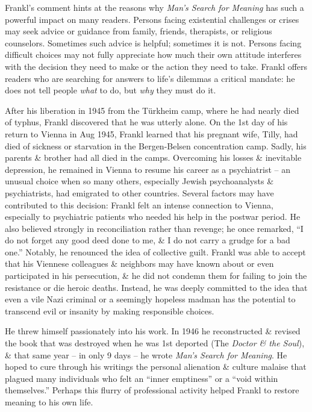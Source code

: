 \documentclass{article}
\numberwithin{equation}{section}
\begin{document}
Frankl's comment hints at the reasons why \textit{Man's Search for Meaning} has such a powerful impact on many readers. Persons facing existential challenges or crises may seek advice or guidance from family, friends, therapists, or religious counselors. Sometimes such advice is helpful; sometimes it is not. Persons facing difficult choices may not fully appreciate how much their own attitude interferes with the decision they need to make or the action they need to take. Frankl offers readers who are searching for answers to life's dilemmas a critical mandate: he does not tell people \textit{what} to do, but \textit{why} they must do it.

After his liberation in 1945 from the T\"urkheim camp, where he had nearly died of typhus, Frankl discovered that he was utterly alone. On the 1st day of his return to Vienna in Aug 1945, Frankl learned that his pregnant wife, Tilly, had died of sickness or starvation in the Bergen-Belsen concentration camp. Sadly, his parents \& brother had all died in the camps. Overcoming his losses \& inevitable depression, he remained in Vienna to resume his career as a psychiatrist -- an unusual choice when so many others, especially Jewish psychoanalysts \& psychiatrists, had emigrated to other countries. Several factors may have contributed to this decision: Frankl felt an intense connection to Vienna, especially to psychiatric patients who needed his help in the postwar period. He also believed strongly in reconciliation rather than revenge; he once remarked, ``I do not forget any good deed done to me, \& I do not carry a grudge for a bad one.'' Notably, he renounced the idea of collective guilt. Frankl was able to accept that his Viennese colleagues \& neighbors may have known about or even participated in his persecution, \& he did not condemn them for failing to join the resistance or die heroic deaths. Instead, he was deeply committed to the idea that even a vile Nazi criminal or a seemingly hopeless madman has the potential to transcend evil or insanity by making responsible choices.

He threw himself passionately into his work. In 1946 he reconstructed \& revised the book that was destroyed when he was 1st deported (The \textit{Doctor \& the Soul}), \& that same year -- in only 9 days -- he wrote \textit{Man's Search for Meaning}. He hoped to cure through his writings the personal alienation \& culture malaise that plagued many individuals who felt an ``inner emptiness'' or a ``void within themselves.'' Perhaps this flurry of professional activity helped Frankl to restore meaning to his own life.
\end{document}
